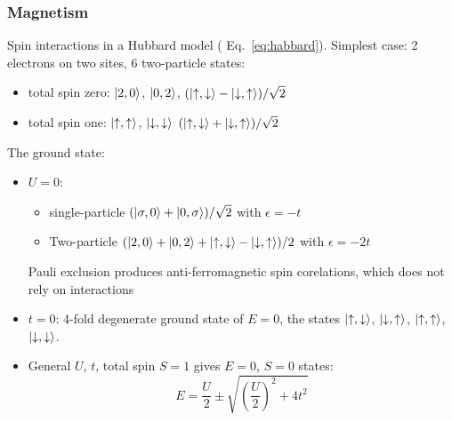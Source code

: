 \documentclass[11pt,letterpaper]{article}
\numberwithin{equation}{section} %
\newcommand{\spind}{\ensuremath{\downarrow}}
\newcommand{\spinu}{\ensuremath{\uparrow}}
\begin{document}
\subsubsection{Magnetism}
\label{ssub:Magnetism}
Spin interactions in a Hubbard model ( Eq.~\ref{eq:habbard}). Simplest case:
2 electrons on two sites, 6 two-particle states: 
\begin{itemize}
	\item total spin zero: $\ket{2, 0}$, $\ket{0,2}$,
		$(\ket{\spinu,\spind}-\ket{\spind,\spinu})/\sqrt 2$
	\item total spin one: $\ket{\spinu,\spinu}$, $\ket{\spind, \spind}$
		$(\ket{\spinu,\spind}+\ket{\spind,\spinu})/\sqrt 2$
\end{itemize}
The ground state: 
\begin{itemize}
	\item $U=0$: 
		\begin{itemize}
		  \item single-particle $(\ket{\sigma,0}+\ket{0,\sigma})/\sqrt{2}$
			  with $\epsilon = -t$
		  \item Two-particle $(\ket{2,0}+\ket{0,2} +
			  \ket{\spinu,\spind}-\ket{\spind,\spinu})/2$ with $\epsilon=-2t$
		\end{itemize}
		Pauli exclusion produces anti-ferromagnetic spin corelations, which
		does not rely on interactions
	\item $t=0$: 4-fold degenerate ground state of $E=0$, the states
		$\ket{\spinu,\spind}$, $\ket{\spind,\spinu}$, $\ket{\spinu,\spinu}$,
		$\ket{\spind,\spind}$. 
	\item General $U$, $t$, total spin $S=1$ gives $E=0$, $S=0$ states: 
		\begin{equation}
			E = \frac U2\pm\sqrt{ \left( \frac U2 \right)^2 + 4t^2}
		\end{equation}
\end{itemize}
\end{document}
